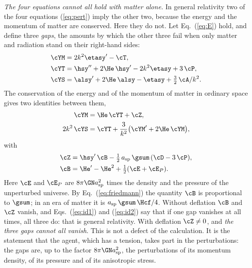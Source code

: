 \emph{The four equations cannot all hold with matter alone.} In general relativity two of the four
equations (\ref{eq:pert}) imply the other two, because the energy and the momentum of matter are
conserved. Here they do not. Let Eq.~(\ref{eq:E}) hold, and define three \emph{gaps}, the amounts by
which the other three fail when only matter and radiation stand on their right-hand sides:
\begin{equation}
\begin{aligned}
\cYM&=2k^{2}\etasy'-\cT,\\
\cYT&=\hsy''+2\He\,\hsy'-2k^{2}\etasy+3\,\cP,\\
\cYS&=\alsy'+2\He\,\alsy-\etasy+\tfrac32\,\cA/k^{2}.
\end{aligned}
\label{eq:gaps}
\end{equation}
The conservation of the energy and of the momentum of matter in ordinary space gives two identities
between them,
\begin{align}
\cYM&=\He\,\cYT+\cZ,\label{eq:id1}\\
2k^{2}\,\cYS&=\cYT+\frac{3}{k^{2}}\big(\cYM'+2\He\,\cYM\big),\label{eq:id2}
\end{align}
with
\begin{equation}
\begin{aligned}
\cZ&=\hsy'\,\cB-\tfrac12\,a_{\mathrm{sp}}\,\gsum\,(\cD-3\,\cP),\\
\cB&=\He'-\He^{2}+\tfrac12(\cE+\cE_P).
\end{aligned}
\label{eq:Z}
\end{equation}
Here $\cE$ and $\cE_P$ are $8\pi\GN a_{\mathrm{sp}}^{2}$ times the density and the pressure of the
unperturbed universe. By Eq.~(\ref{eq:friedmann}) the quantity $\cB$ is proportional to $\gsum$; in
an era of matter it is $a_{\mathrm{sp}}\,\gsum\,\Hcf/4$. Without deflation $\cB$ and $\cZ$ vanish,
and Eqs.~(\ref{eq:id1}) and (\ref{eq:id2}) say that if one gap vanishes at all times, all three do:
that is general relativity. With deflation $\cZ\neq0$, and \emph{the three gaps cannot all vanish}.
This is not a defect of the calculation. It is the statement that the agent, which has a tension,
takes part in the perturbations: the gaps are, up to the factor $8\pi\GN a_{\mathrm{sp}}^{2}$, the
perturbations of its momentum density, of its pressure and of its anisotropic stress.

